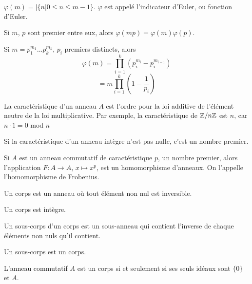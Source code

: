 \documentclass[12pt,a4paper]{article}
\begin{document}
\begin{flushleft}
\begin{rap}
$\varphi (m) = | \{ n | 0 \leqslant n \leqslant m-1 \}$. $\varphi$ est appelé l'indicateur d'Euler, ou fonction d'Euler.
\end{rap}

\begin{prop}
Si $m$, $p$ sont premier entre eux, alors $\varphi (m p) = \varphi (m) \varphi (p)$.
\end{prop}

\begin{cor}
Si $m = p_1^{m_1} \ldots p_k^{m_k}$, $p_i$ premiers distincts, alors 
$$ \varphi (m) = \prod_{i = 1}^{k} (p_i^{m_i} - p_i^{m_{i-1}})$$
$$= m \prod_{i = 1}^{k} (1-\frac{1}{p_i}) $$
\end{cor}

\begin{mydef}
La caractéristique d'un anneau $A$ est l'ordre pour la loi additive de l'élément neutre de la loi multiplicative. Par exemple, la caractéristique de $\mathbb{Z} / n \mathbb{Z}$ est $n$, car $n \cdot 1 = 0$ mod $n$
\end{mydef}

\begin{prop}
Si la caractéristique d'un anneau intègre n'est pas nulle, c'est un nombre premier.
\end{prop}

\begin{prop}
Si $A$ est un anneau commutatif de caractéristique $p$, un nombre premier, alors l'application $F: A \rightarrow A$, $x \mapsto x^p$, est un homomorphisme d'anneaux. On l'appelle l'homomorphisme de Frobenius.
\end{prop}

\begin{mydef}
Un corps est un anneau où tout élément non nul est inversible.
\end{mydef}

\begin{prop}
Un corps est intègre.
\end{prop}

\begin{mydef}
Un sous-corps d'un corps est un sous-anneau qui contient l'inverse de chaque éléments non nuls qu'il contient.
\end{mydef}

\begin{rem}
Un sous-corps est un corps.
\end{rem}

\begin{prop}
L'anneau commutatif $A$ est un corps si et seulement si ses seuls idéaux sont $\{ 0 \}$ et $A$.
\end{prop}


\end{flushleft}
\end{document}
